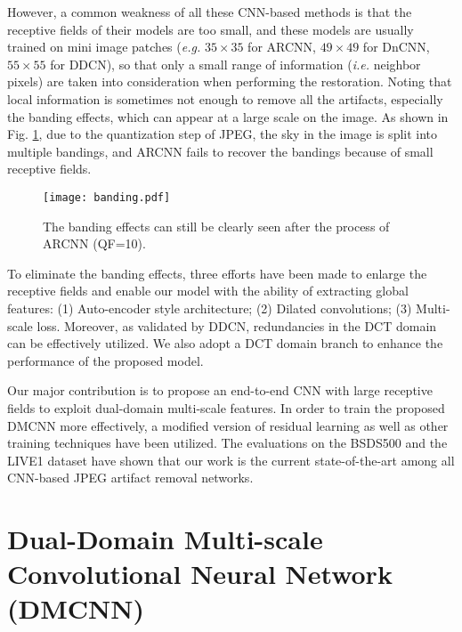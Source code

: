 \documentclass{article}
\begin{document}
However, a common weakness of all these CNN-based methods is that
the receptive fields of their models are too small, and these models are
usually trained on mini image patches (\textit{e.g.} $35 \times 35$ for ARCNN,
$49 \times 49$ for DnCNN, $55 \times 55$ for DDCN), so that only a
small range of information (\textit{i.e.} neighbor pixels) are
taken into consideration when performing the restoration. Noting that
local information is sometimes not enough to remove all the artifacts,
especially the banding effects, which can appear at a large scale on the image.
As shown in Fig. \ref{fig:f1}, due to the quantization step of JPEG,
the sky in the image is split into multiple bandings, and ARCNN fails to
recover the bandings because of small receptive fields.

\begin{figure}[htb]
  \begin{minipage}[b]{1.0\linewidth}
    \centering
    \centerline{\texttt{[image: banding.pdf]}}
    \caption{The banding effects can still be clearly seen
    after the process of ARCNN (QF=10).}\medskip
    \label{fig:f1}
    \vspace{-0.5cm}
  \end{minipage}
\end{figure}

To eliminate the banding effects, three efforts have been made to
enlarge the receptive fields and enable our model with
the ability of extracting global features:
(1) Auto-encoder style architecture; (2) Dilated convolutions;
(3) Multi-scale loss. Moreover, as validated by DDCN, redundancies in
the DCT domain can be effectively utilized. We also adopt a DCT domain branch
to enhance the performance of the proposed model.

Our major contribution is to propose an end-to-end CNN with
large receptive fields to exploit dual-domain multi-scale features. In order to
train the proposed DMCNN more effectively, a modified version of
residual learning as well as other training techniques have been utilized.
The evaluations on the BSDS500 and the LIVE1 dataset have shown that our work
is the current state-of-the-art among all CNN-based JPEG artifact removal networks.
\vspace{-0.2cm}

\section{Dual-Domain Multi-scale
Convolutional Neural Network (DMCNN)}
\label{sec:model}
\vspace{-0.2cm}
   
\end{document}
